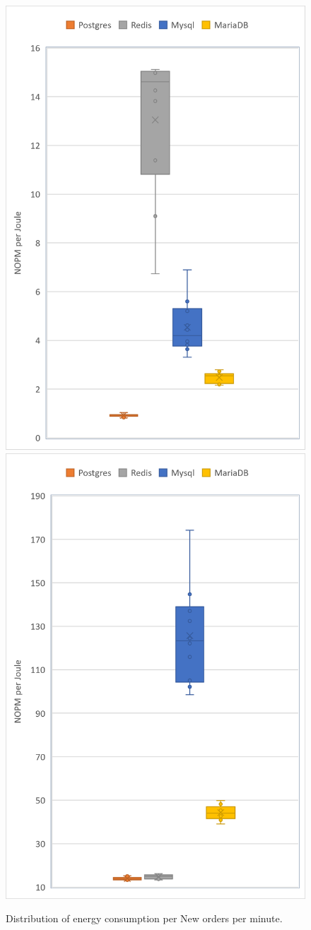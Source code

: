 \begin{figure}[h!]
\centering
\caption{Distribution of energy consumption per New orders per minute.}
\includegraphics[width=0.6\columnwidth]{results/boxplot/Packgage-nopm.png}
\includegraphics[width=0.6\columnwidth]{results/boxplot/Disk-nopm.png}

\end{figure}
